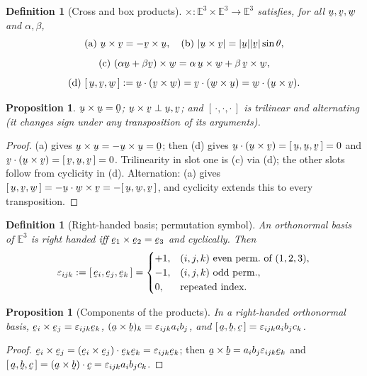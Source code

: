 \documentclass[17pt,a4paper]{extreport}
\DeclareRobustCommand{\vek}[1]{\underaccent{\tilde}{#1}}
\newcommand{\Et}{\mathbb{E}^{3}}
\newcommand{\ba}{\vek{a}}
\newcommand{\bb}{\vek{b}}
\newcommand{\bc}{\vek{c}}
\newcommand{\bu}{\vek{u}}
\newcommand{\bv}{\vek{v}}
\newcommand{\bw}{\vek{w}}
\newcommand{\be}{\vek{e}}
\newcommand{\bze}{\vek{0}}
\newcommand{\eps}{\varepsilon}
\newcommand{\tbox}[3]{[\,#1,#2,#3\,]}
\newcommand{\ip}[2]{#1\cdot#2}
\theoremstyle{scplain}
\newtheorem{proposition}[theorem]{Proposition}
\theoremstyle{scdefn}
\newtheorem{definition}[theorem]{Definition}
\theoremstyle{scplain}
\begin{document}
\begin{definition}[Cross and box products]\label{def:cross}
$\times:\Et\times\Et\to\Et$ satisfies, for all $\bu,\bv,\bw$ and
$\alpha,\beta$,
\[
\text{(a)}\ \bu\times\bv=-\bv\times\bu,\quad
\text{(b)}\ |\bu\times\bv|=|\bu||\bv|\sin\theta,
\]
\[
\text{(c)}\ (\alpha\bu+\beta\bv)\times\bw
 =\alpha\,\bu\times\bw+\beta\,\bv\times\bw,
\]
\[
\text{(d)}\ \tbox\bu\bv\bw:=\ip\bu{(\bv\times\bw)}
=\ip\bv{(\bw\times\bu)}=\ip\bw{(\bu\times\bv)}.
\]
\end{definition}

\begin{proposition}\label{prop:boxprops}
$\bu\times\bu=\bze$; $\bu\times\bv\perp\bu,\bv$; and $\tbox\cdot\cdot\cdot$
is trilinear and alternating (it changes sign under any transposition of
its arguments).
\end{proposition}

\begin{proof}
(a) gives $\bu\times\bu=-\bu\times\bu=\bze$; then (d) gives
$\ip\bu{(\bu\times\bv)}=\tbox\bu\bu\bv=0$ and
$\ip\bv{(\bu\times\bv)}=\tbox\bv\bu\bv=0$. Trilinearity in slot one is (c)
via (d); the other slots follow from cyclicity in (d). Alternation: (a)
gives $\tbox\bu\bv\bw=-\ip\bu{\bw\times\bv}=-\tbox\bu\bw\bv$, and cyclicity
extends this to every transposition.
\end{proof}

\begin{definition}[Right-handed basis; permutation symbol]\label{def:perm}
An orthonormal basis of $\Et$ is right handed iff
$\be_{1}\times\be_{2}=\be_{3}$ and cyclically. Then
\[
\eps_{ijk}:=\tbox{\be_{i}}{\be_{j}}{\be_{k}}=
\begin{cases}+1,&(i,j,k)\ \text{even perm.\ of}\ (1,2,3),\\
-1,&(i,j,k)\ \text{odd perm.},\\ 0,&\text{repeated index.}\end{cases}
\]
\end{definition}

\begin{proposition}[Components of the products]\label{prop:crosscomp}
In a right-handed orthonormal basis,
$\be_{i}\times\be_{j}=\eps_{ijk}\be_{k}$,
$(\ba\times\bb)_{k}=\eps_{ijk}a_{i}b_{j}$, and
$\tbox\ba\bb\bc=\eps_{ijk}a_{i}b_{j}c_{k}$.
\end{proposition}

\begin{proof}
$\be_{i}\times\be_{j}=\ip{(\be_{i}\times\be_{j})}{\be_{k}}\be_{k}
=\eps_{ijk}\be_{k}$; then
$\ba\times\bb=a_{i}b_{j}\eps_{ijk}\be_{k}$ and
$\tbox\ba\bb\bc=\ip{(\ba\times\bb)}\bc=\eps_{ijk}a_{i}b_{j}c_{k}$.
\end{proof}
\end{document}
